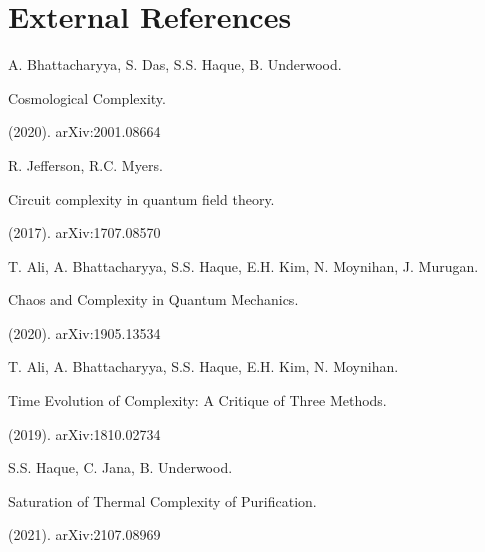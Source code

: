 \documentclass{article}
\begin{document}
\section*{External References}
\begin{enumerate}[label={[\arabic*]}]\item A. Bhattacharyya, S. Das, S.S. Haque, B. Underwood. \begin{textit}Cosmological Complexity. \end{textit}(2020). arXiv:2001.08664
\item R. Jefferson, R.C. Myers. \begin{textit}Circuit complexity in quantum field theory. \end{textit}(2017). arXiv:1707.08570
\item T. Ali, A. Bhattacharyya, S.S. Haque, E.H. Kim, N. Moynihan, J. Murugan. \begin{textit}Chaos and Complexity in Quantum Mechanics. \end{textit}(2020). arXiv:1905.13534
\item T. Ali, A. Bhattacharyya, S.S. Haque, E.H. Kim, N. Moynihan. \begin{textit}Time Evolution of Complexity: A Critique of Three Methods. \end{textit}(2019). arXiv:1810.02734
\item S.S. Haque, C. Jana, B. Underwood. \begin{textit}Saturation of Thermal Complexity of Purification. \end{textit}(2021). arXiv:2107.08969
\end{enumerate}
\end{document}
